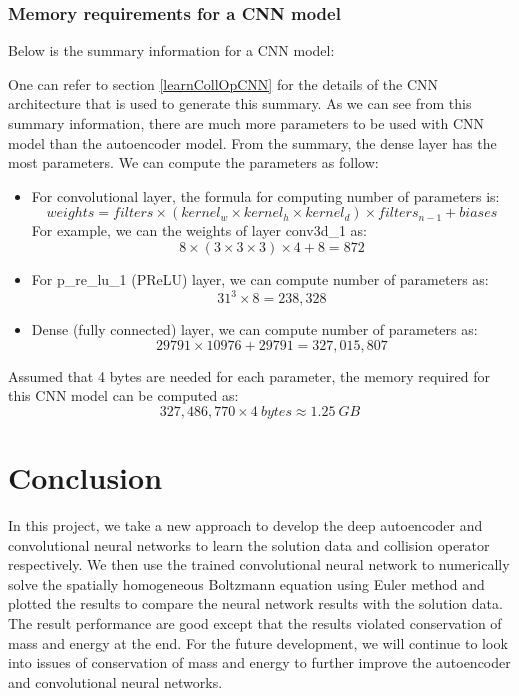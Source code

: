 \documentclass{article}
\begin{document}
\subsubsection{Memory requirements for a CNN model}
Below is the summary information for a CNN model:

One can refer to section \ref{learnCollOpCNN} for the details of the CNN architecture that is used to generate this summary.
As we can see from this summary information, there are much more parameters to be used with CNN model than the autoencoder model.
From the summary, the dense layer has the most parameters. We can compute the parameters as follow:
\begin{itemize}
	\item For convolutional layer, the formula for computing number of parameters is:
	\[ weights = filters \times (kernel_w \times kernel_h \times kernel_d) \times filters_{n-1} + biases \]
	For example, we can the weights of layer conv3d\_1 as:
	\[ 8 \times (3 \times 3 \times 3) \times 4 + 8 = 872 \]
	\item For p\_re\_lu\_1 (PReLU) layer, we can compute number of parameters as:
	\[ 31^3 \times 8 = 238,328 \] 
	\item Dense (fully connected) layer, we can compute number of parameters as:
	\[ 29791 \times 10976 + 29791 = 327,015,807 \]
	
\end{itemize}
Assumed that 4 bytes are needed for each parameter, the memory required for this CNN model can be computed as:
\[ 327,486,770 \times 4 \ bytes \approx 1.25 \  GB \]

\section{Conclusion} \label{Conclusion}
In this project, we take a new approach to develop the deep autoencoder and convolutional neural networks to learn the solution data and collision operator respectively. We then use the trained convolutional neural network to numerically solve the spatially homogeneous Boltzmann equation using Euler method and plotted the results to compare the neural network results with the solution data. The result performance are good except that the results violated conservation of mass and energy at the end. For the future development, we will continue to look into issues of conservation of mass and energy to further improve the autoencoder and convolutional neural networks.
 
\appendix
\appendixpage
\end{document}
